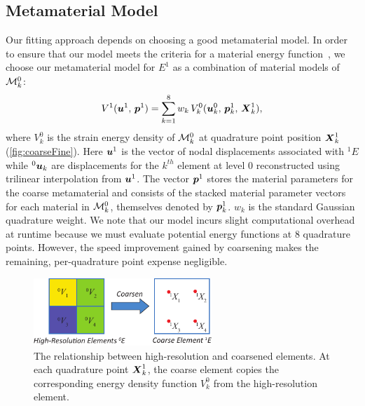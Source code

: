 \subsection{Metamaterial Model}
Our fitting approach depends on choosing a good metamaterial model.
In order to ensure that our model meets the criteria for a material energy function~\cite{Marsden2012}, we choose our metamaterial model for $\mathit{E}^1$ as a combination of material models of $\mathcal{M}_k^0$:
\begin{align}
V^1(\mbox{$\bm{u}$}^1, \, \mbox{$\bm{p}$}^1) = \sum_{k=1}^8 w_k \, V_k^0(\mbox{$\bm{u}$}_k^0, \, \mbox{$\bm{p}$}_k^1, \, \mbox{$\bm{X}$}_k^1),
\label{eq:materialModel}
\end{align}
where $V_k^0$ is the strain energy density of $\mathcal{M}_k^0$ at quadrature point position $\mbox{$\bm{X}$}_k^1$ (\autoref{fig:coarseFine}). Here $\mbox{$\bm{u}$}^1$ is the vector of nodal displacements associated with $^1\mathit{E}$ while $^0\mbox{$\bm{u}$}_k$ are displacements for the $k^{th}$ element at level $0$ reconstructed using trilinear interpolation from $\mbox{$\bm{u}$}^1$. The vector $\mbox{$\bm{p}$}^1$ stores the material parameters for the coarse metamaterial and consists of the stacked material parameter vectors for each material in $\mathcal{M}_k^0$, themselves denoted by $\mbox{$\bm{p}$}_k^1$.  $w_k$ is the standard Gaussian quadrature weight.
We note that our model incurs slight computational overhead at runtime because we must evaluate potential energy functions at 8 quadrature points.
However, the speed improvement gained by coarsening makes the remaining, per-quadrature point expense negligible.

\begin{figure}
	\centering
	\includegraphics[width=0.6\textwidth]{images/coarseFine.pdf}
	\caption{The relationship between high-resolution and coarsened elements. At each quadrature point $\mbox{$\bm{X}$}_k^1$, the coarse element copies the corresponding energy density function $V_k^0$ from the high-resolution element.}
	\label{fig:coarseFine}
\end{figure}

